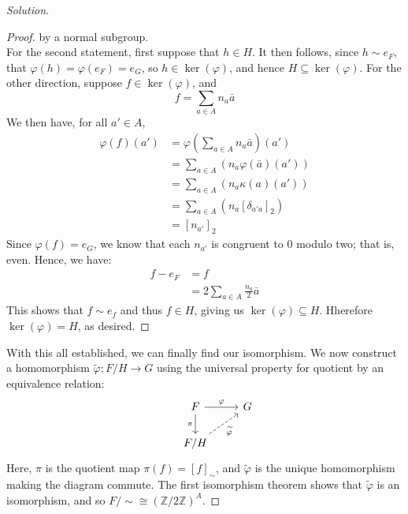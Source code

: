 \documentclass[12pt]{article}
\newenvironment{solution}
  {\renewcommand\qedsymbol{$\blacksquare$}\begin{proof}[Solution]}
{\end{proof}}
\newenvironment{sproof}{
  \renewcommand\qedsymbol{$\square$}
  \begin{proof}
  }{
  \end{proof}
}
\theoremstyle{remark}
\begin{document}
\begin{solution}
\begin{sproof}
    by a normal subgroup. \\
    For the second statement, first suppose that $h\in H$. 
    It then follows, since $h\sim e_F$, that $\varphi(h) = \varphi(e_F) = e_G$, so $h\in \ker(\varphi)$,
    and hence $H\subseteq \ker(\varphi)$.
    For the other direction, suppose $f\in\ker(\varphi)$, and 
    \begin{equation*}
      f = \sum_{a\in A} n_a \bar{a}
    \end{equation*}
    We then have, for all $a'\in A$,
    \begin{align*}
      \varphi(f)(a') &= \varphi\left( \sum_{a\in A} n_a\bar{a} \right)(a') \\
      &= \sum_{a\in A}\left( n_a\varphi(\bar{a})(a') \right) \\
      &= \sum_{a\in A}\left( n_a\kappa(a)(a') \right) \\
      &= \sum_{a\in A}\left( n_a[\delta_{a'a}]_2 \right) \\
      &= [n_{a'}]_2
    \end{align*}
    Since $\varphi(f) = e_G$, we know that each $n_{a'}$ is congruent to 0 modulo two; that is, even.
    Hence, we have:
    \begin{align*}
      f - e_F &= f \\
      &= 2\sum_{a\in A} \frac{n_a}{2} \bar{a}
    \end{align*}
    This shows that $f\sim e_f$ and thus $f \in H$, giving us $\ker(\varphi)\subseteq H$.
    Hherefore $\ker(\varphi) = H$, as desired.
  \end{sproof}
  With this all established, we can finally find our isomorphism.
  We now construct a homomorphism 
  $\widetilde{\varphi} : F/H\to G$ using the universal property for quotient by an equivalence relation:
  \[\begin{tikzcd}
      & F \ar{d}[swap]{\pi} \ar{r}{\varphi} & G \\
    & F/H \ar[dashed]{ur}[swap]{\widetilde{\varphi}} &
  \end{tikzcd}\]
  Here, $\pi$ is the quotient map $\pi(f) = [f]_{\sim}$, and $\widetilde{\varphi}$ is the unique homomorphism
  making the diagram commute.
  The first isomorphism theorem shows that $\widetilde{\varphi}$ is an isomorphism,
  and so $F/{\sim} \cong (\mathbb{Z}/2\mathbb{Z})^A$.
\end{solution}
\end{document}
